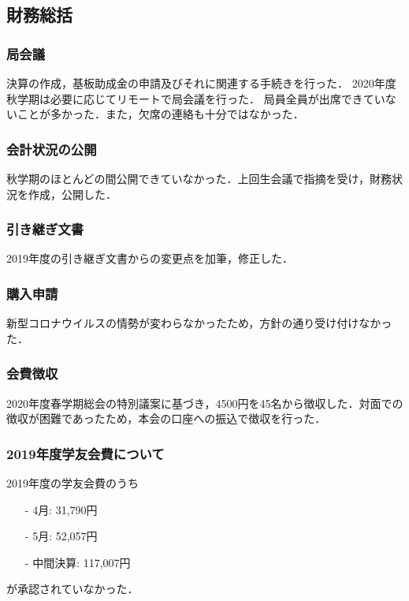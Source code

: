 \subsection*{財務総括}


\subsubsection*{局会議}
決算の作成，基板助成金の申請及びそれに関連する手続きを行った．
2020年度秋学期は必要に応じてリモートで局会議を行った．
局員全員が出席できていないことが多かった．また，欠席の連絡も十分ではなかった．


\subsubsection*{会計状況の公開}
秋学期のほとんどの間公開できていなかった．上回生会議で指摘を受け，財務状況を作成，公開した．


\subsubsection*{引き継ぎ文書}
2019年度の引き継ぎ文書からの変更点を加筆，修正した．


\subsubsection*{購入申請}
新型コロナウイルスの情勢が変わらなかったため，方針の通り受け付けなかった．


\subsubsection*{会費徴収}
2020年度春学期総会の特別議案に基づき，4500円を45名から徴収した．対面での徴収が困難であったため，本会の口座への振込で徴収を行った．


\subsubsection*{2019年度学友会費について}
2019年度の学友会費のうち
\begin{itemize}
	\item[-] 4月: 31,790円
	\item[-] 5月: 52,057円
	\item[-] 中間決算: 117,007円
\end{itemize} 
が承認されていなかった．

